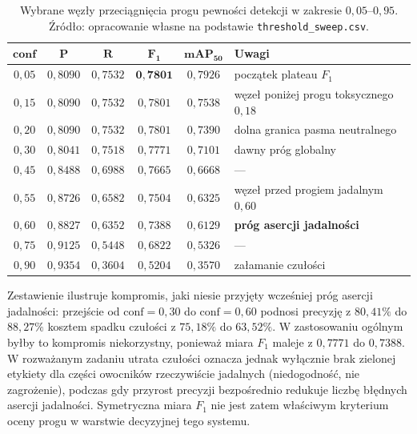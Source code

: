 \begin{table}[htbp]
 \centering
 \caption{Wybrane węzły przeciągnięcia progu pewności detekcji w zakresie $0{,}05$--$0{,}95$. Źródło: opracowanie własne na podstawie \texttt{threshold\_sweep.csv}.}
 \label{tab:threshold_sweep}
 \begin{tabular}{|c|c|c|c|c|p{4.4cm}|}
 \hline
 $\mathbf{conf}$ & $\boldsymbol{P}$ & $\boldsymbol{R}$ & $\boldsymbol{F_1}$ & $\boldsymbol{mAP_{50}}$ & \textbf{Uwagi} \\
 \hline \hline
 $0{,}05$ & $0{,}8090$ & $0{,}7532$ & $\mathbf{0{,}7801}$ & $0{,}7926$ & początek plateau $F_1$ \\
 \hline
 $0{,}15$ & $0{,}8090$ & $0{,}7532$ & $0{,}7801$ & $0{,}7538$ & węzeł poniżej progu toksycznego $0{,}18$ \\
 \hline
 $0{,}20$ & $0{,}8090$ & $0{,}7532$ & $0{,}7801$ & $0{,}7390$ & dolna granica pasma neutralnego \\
 \hline
 $0{,}30$ & $0{,}8041$ & $0{,}7518$ & $0{,}7771$ & $0{,}7101$ & dawny próg globalny \\
 \hline
 $0{,}45$ & $0{,}8488$ & $0{,}6988$ & $0{,}7665$ & $0{,}6668$ & --- \\
 \hline
 $0{,}55$ & $0{,}8726$ & $0{,}6582$ & $0{,}7504$ & $0{,}6325$ & węzeł przed progiem jadalnym $0{,}60$ \\
 \hline
 $0{,}60$ & $0{,}8827$ & $0{,}6352$ & $0{,}7388$ & $0{,}6129$ & \textbf{próg asercji jadalności} \\
 \hline
 $0{,}75$ & $0{,}9125$ & $0{,}5448$ & $0{,}6822$ & $0{,}5326$ & --- \\
 \hline
 $0{,}90$ & $0{,}9354$ & $0{,}3604$ & $0{,}5204$ & $0{,}3570$ & załamanie czułości \\
 \hline
 \end{tabular}
\end{table}

Zestawienie ilustruje kompromis, jaki niesie przyjęty wcześniej próg asercji jadalności: przejście od $\mathrm{conf}=0{,}30$ do $\mathrm{conf}=0{,}60$ podnosi precyzję z $80{,}41\%$ do $88{,}27\%$ kosztem spadku czułości z $75{,}18\%$ do $63{,}52\%$. W zastosowaniu ogólnym byłby to kompromis niekorzystny, ponieważ miara $F_1$ maleje z $0{,}7771$ do $0{,}7388$. W rozważanym zadaniu utrata czułości oznacza jednak wyłącznie brak zielonej etykiety dla części owocników rzeczywiście jadalnych (niedogodność, nie zagrożenie), podczas gdy przyrost precyzji bezpośrednio redukuje liczbę błędnych asercji jadalności. Symetryczna miara $F_1$ nie jest zatem właściwym kryterium oceny progu w warstwie decyzyjnej tego systemu.

